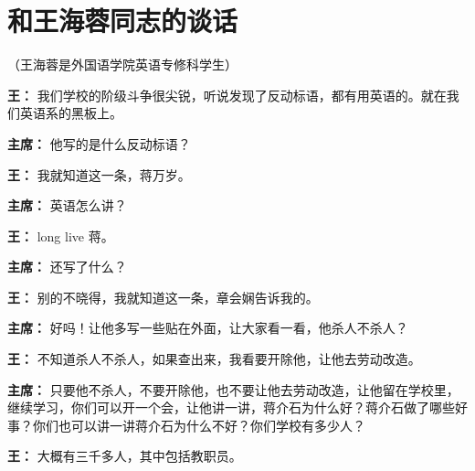 \section[和王海蓉同志的谈话（一九六四年六月二十四日）]{和王海蓉同志的谈话}


（王海蓉是外国语学院英语专修科学生）

\begin{list}{}{
    \setlength{\topsep}{0pt}        %
    \setlength{\partopsep}{0pt}     %
    \setlength{\parsep}{\parskip}   %
    \setlength{\itemsep}{\lineskip}       %
    \setlength{\labelsep}{0pt}%
    \setlength{\labelwidth}{3em}%
    \setlength{\itemindent}{0pt}%
    \setlength\listparindent{\parindent}
    \setlength{\leftmargin}{3em}
    \setlength{\rightmargin}{0pt}
    }

\item[\textbf{王：}] 我们学校的阶级斗争很尖锐，听说发现了反动标语，都有用英语的。就在我们英语系的黑板上。

\item[\textbf{主席：}] 他写的是什么反动标语？

\item[\textbf{王：}] 我就知道这一条，蒋万岁。

\item[\textbf{主席：}] 英语怎么讲？

\item[\textbf{王：}] long live 蒋。

\item[\textbf{主席：}] 还写了什么？

\item[\textbf{王：}] 别的不晓得，我就知道这一条，章会娴告诉我的。

\item[\textbf{主席：}] 好吗！让他多写一些贴在外面，让大家看一看，他杀人不杀人？

\item[\textbf{王：}] 不知道杀人不杀人，如果查出来，我看要开除他，让他去劳动改造。

\item[\textbf{主席：}] 只要他不杀人，不要开除他，也不要让他去劳动改造，让他留在学校里，继续学习，你们可以开一个会，让他讲一讲，蒋介石为什么好？蒋介石做了哪些好事？你们也可以讲一讲蒋介石为什么不好？你们学校有多少人？

\item[\textbf{王：}] 大概有三千多人，其中包括教职员。


\end{list}
